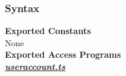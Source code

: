 \documentclass[12pt, titlepage]{article}
\begin{document}

\subsubsection{Syntax}

\textbf{Exported Constants}\\
None\\

\noindent \textbf{Exported Access Programs}\\
\noindent \underline{\textbf{\textit{useraccount.ts}}}
\end{document}
